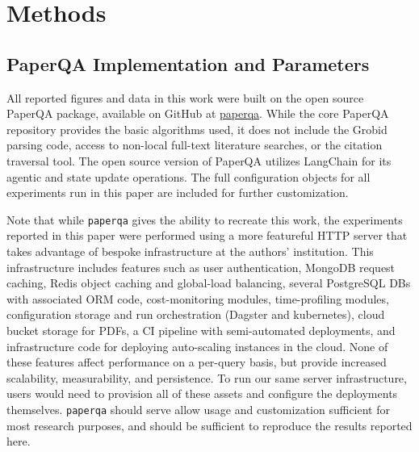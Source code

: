 \renewcommand{\thesuppfigure}{S\arabic{suppfigure}}
\setcounter{suppfigure}{0}

\section{Methods}

\subsection{PaperQA Implementation and Parameters}

All reported figures and data in this work were built on the open source PaperQA package, available on GitHub at \href{https://github.com/Future-House/paper-qa}{paperqa}. While the core PaperQA repository provides the basic algorithms used, it does not include the Grobid parsing code, access to non-local full-text literature searches, or the citation traversal tool. The open source version of PaperQA utilizes LangChain \cite{LANGCHAIN} for its agentic and state update operations. The full configuration objects for all experiments run in this paper are included for further customization.

Note that while \texttt{paperqa} gives the ability to recreate this work, the experiments reported in this paper were performed using a more featureful HTTP server that takes advantage of bespoke infrastructure at the authors' institution. This infrastructure includes features such as user authentication, MongoDB request caching, Redis object caching and global-load balancing, several PostgreSQL DBs with associated ORM code, cost-monitoring modules, time-profiling modules, configuration storage and run orchestration (Dagster\cite{dagster} and kubernetes\cite{kubernetes}), cloud bucket storage for PDFs, a CI pipeline with semi-automated deployments, and infrastructure code for deploying auto-scaling instances in the cloud. None of these features affect performance on a per-query basis, but provide increased scalability, measurability, and persistence. To run our same server infrastructure, users would need to provision all of these assets and configure the deployments themselves. \texttt{paperqa} should serve allow usage and customization sufficient for most research purposes, and should be sufficient to reproduce the results reported here.

